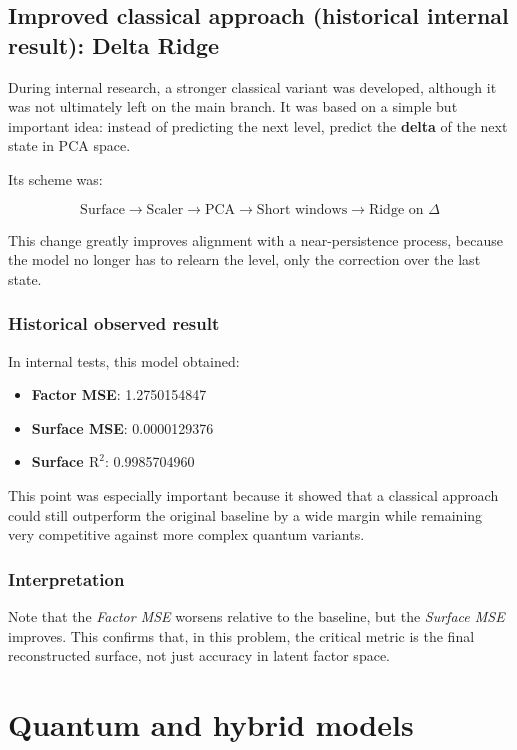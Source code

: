\documentclass[11pt,a4paper]{article}
\newcommand{\Rtwo}{\ensuremath{\mathrm{R}^2}}
\begin{document}
\subsection{Improved classical approach (historical internal result): Delta Ridge}

During internal research, a stronger classical variant was developed, although it was not ultimately left on the main branch. It was based on a simple but important idea: instead of predicting the next level, predict the \textbf{delta} of the next state in PCA space.

Its scheme was:

\[
\text{Surface} \rightarrow \text{Scaler} \rightarrow \text{PCA} \rightarrow \text{Short windows} \rightarrow \text{Ridge on }\Delta
\]

This change greatly improves alignment with a near-persistence process, because the model no longer has to relearn the level, only the correction over the last state.

\subsubsection{Historical observed result}
In internal tests, this model obtained:

\begin{itemize}
    \item \textbf{Factor MSE}: 1.2750154847
    \item \textbf{Surface MSE}: 0.0000129376
    \item \textbf{Surface $\Rtwo$}: 0.9985704960
\end{itemize}

This point was especially important because it showed that a classical approach could still outperform the original baseline by a wide margin while remaining very competitive against more complex quantum variants.

\subsubsection{Interpretation}
Note that the \textit{Factor MSE} worsens relative to the baseline, but the \textit{Surface MSE} improves. This confirms that, in this problem, the critical metric is the final reconstructed surface, not just accuracy in latent factor space.

\section{Quantum and hybrid models}
\end{document}
